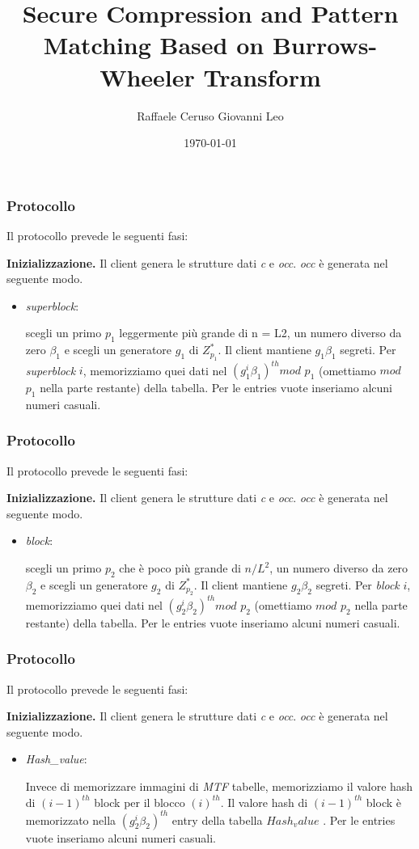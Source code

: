 \documentclass{beamer}
\title{Secure Compression and Pattern Matching Based on Burrows-Wheeler Transform}
\author{Raffaele Ceruso Giovanni Leo}
\date{\today}
\begin{document}
\begin{frame}
	\titlepage
\end{frame}
\begin{frame}
\frametitle{Protocollo}
Il protocollo prevede le seguenti fasi:

\textbf{Inizializzazione.} Il client genera le strutture dati \textit{c} e \textit{occ}. \textit{occ} è generata nel seguente modo.

\begin{itemize}
	\item \textit{superblock}:
	
	scegli un primo $ p_{1} $ leggermente più grande
	di n = L2, un numero diverso da zero $ \beta_{1} $ e scegli un generatore
	$g_{1}$ di $ Z^{*}_{p_{1}} $. Il client mantiene $ g_{1} \beta_{1} $ segreti. Per \textit{superblock} $ i $, memorizziamo quei dati nel $ (g^{i}_{1}\beta_{1})^{th} mod$ $p_{1}$
	(omettiamo $mod$ $ p_{1}$ nella parte restante) della tabella.
	Per le entries vuote inseriamo alcuni numeri casuali.
\end{itemize}
\end{frame}
\begin{frame}
\frametitle{Protocollo}
Il protocollo prevede le seguenti fasi:

\textbf{Inizializzazione.} Il client genera le strutture dati \textit{c} e \textit{occ}. \textit{occ} è generata nel seguente modo.

\begin{itemize}
	\item \textit{block}:
	
	scegli un primo $ p_{2} $ che è poco più grande di $n/L^{2}$,
	un numero diverso da zero $ \beta_{2} $ e scegli un generatore $g_{2}$ di $ Z^{*}_{p_{2}} $.
	Il client mantiene $ g_{2} \beta_{2} $ segreti. Per \textit{block} $ i $, memorizziamo quei dati nel $ (g^{i}_{2}\beta_{2})^{th} mod$ $p_{2}$
	(omettiamo $mod$ $ p_{2}$ nella parte restante) della tabella.
	Per le entries vuote inseriamo alcuni numeri casuali.
\end{itemize}
\end{frame}
\begin{frame}
\frametitle{Protocollo}
Il protocollo prevede le seguenti fasi:

\textbf{Inizializzazione.} Il client genera le strutture dati \textit{c} e \textit{occ}. \textit{occ} è generata nel seguente modo.

\begin{itemize}
	\item \textit{Hash\_value}:
	
	Invece di memorizzare immagini di \textit{MTF}
	tabelle, memorizziamo il valore hash di $ (i-1)^{th} $ block
	per il blocco $ (i)^{th} $. Il valore hash di $ (i-1)^{th} $ block
	è memorizzato nella $ (g^{i}_{2}\beta_{2})^{th}$ entry della tabella $Hash_value$ .
	Per le entries vuote inseriamo alcuni numeri casuali.
\end{itemize}
\end{frame}
\end{document}
